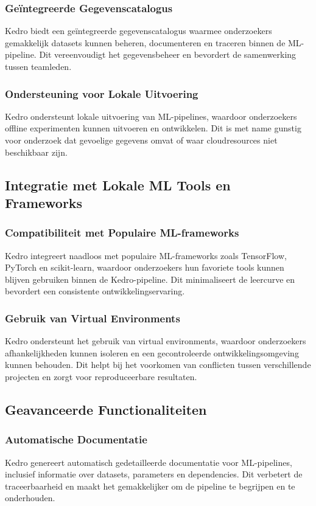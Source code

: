 \subsubsection{Geïntegreerde Gegevenscatalogus}
Kedro biedt een geïntegreerde gegevenscatalogus waarmee onderzoekers gemakkelijk datasets kunnen beheren, documenteren en traceren binnen de ML-pipeline. Dit vereenvoudigt het gegevensbeheer en bevordert de samenwerking tussen teamleden.

\subsubsection{Ondersteuning voor Lokale Uitvoering}
Kedro ondersteunt lokale uitvoering van ML-pipelines, waardoor onderzoekers offline experimenten kunnen uitvoeren en ontwikkelen. Dit is met name gunstig voor onderzoek dat gevoelige gegevens omvat of waar cloudresources niet beschikbaar zijn.

\subsection{Integratie met Lokale ML Tools en Frameworks}

\subsubsection{Compatibiliteit met Populaire ML-frameworks}
Kedro integreert naadloos met populaire ML-frameworks zoals TensorFlow, PyTorch en scikit-learn, waardoor onderzoekers hun favoriete tools kunnen blijven gebruiken binnen de Kedro-pipeline. Dit minimaliseert de leercurve en bevordert een consistente ontwikkelingservaring.

\subsubsection{Gebruik van Virtual Environments}
Kedro ondersteunt het gebruik van virtual environments, waardoor onderzoekers afhankelijkheden kunnen isoleren en een gecontroleerde ontwikkelingsomgeving kunnen behouden. Dit helpt bij het voorkomen van conflicten tussen verschillende projecten en zorgt voor reproduceerbare resultaten.

\subsection{Geavanceerde Functionaliteiten}

\subsubsection{Automatische Documentatie}
Kedro genereert automatisch gedetailleerde documentatie voor ML-pipelines, inclusief informatie over datasets, parameters en dependencies. Dit verbetert de traceerbaarheid en maakt het gemakkelijker om de pipeline te begrijpen en te onderhouden.

